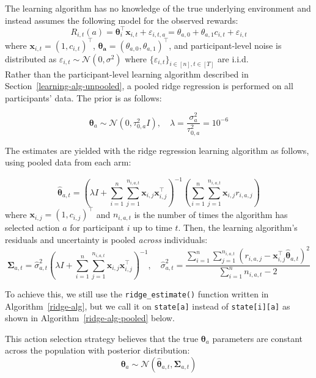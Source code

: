 \documentclass[letterpaper, 9pt]{extarticle}
\begin{document}
\begin{notebox}
The learning algorithm has no knowledge of the true underlying environment and instead assumes the following model for the observed rewards:
$$R_{i,t}(a) = \boldsymbol{\theta}_{i}^\top \boldsymbol{x}_{i,t} + \varepsilon_{i,t,a}=\theta_{a,0}+\theta_{a,1}c_{i,t}+\varepsilon_{i,t}$$
where $\boldsymbol{x}_{i,t} = (1, c_{i,t})^\top$, $\boldsymbol{\theta_{a}} = (\theta_{a,0}, \theta_{a,1})^\top$, and participant-level noise is distributed as $\varepsilon_{i,t} \sim \mathcal{N}(0,\sigma^2)$  where $\{\varepsilon_{i,t}\}_{i\in[n], t\in [T]}$ are i.i.d. \\

Rather than the participant-level learning algorithm described in Section~\ref{learning-alg-unpooled}, a pooled ridge regression is performed on all participants' data. The prior is as follows:

$$
\boldsymbol{\theta}_{a} \sim \mathcal{N}(0, \tau_{0,a}^2 I),
\quad
\lambda = \frac{\sigma_a^2}{\tau_{0,a}^2}=10^{-6}
$$

The estimates are yielded with the ridge regression learning algorithm as follows, using pooled data from each arm:

\[
\hat{\boldsymbol{\theta}}_{a,t}
=
\left(
\lambda I
+
\sum_{i=1}^{n}\sum_{j=1}^{n_{i,a,t}}
\boldsymbol{x}_{i,j}\boldsymbol{x}_{i,j}^{\top}
\right)^{-1}
\left(
\sum_{i=1}^{n}\sum_{j=1}^{n_{i,a,t}}
\boldsymbol{x}_{i,j}r_{i,a,j}
\right)
\]
 where $\boldsymbol{x}_{i,j} = (1, c_{i,j})^\top$ and $n_{i,a,t}$ is the number of times the algorithm has selected action $a$ for participant $i$ up to time $t$. Then, the learning algorithm's residuals and uncertainty is pooled \textit{across} individuals:
\[
\boldsymbol{\Sigma}_{a,t}
=
\hat{\sigma}_{a,t}^2
\left(
\lambda I
+
\sum_{i=1}^{n}\sum_{j=1}^{n_{i,a,t}}
\boldsymbol{x}_{i,j}\boldsymbol{x}_{i,j}^{\top}
\right)^{-1},
\quad
\hat{\sigma}_{a,t}^2
=
\frac{
\sum_{i=1}^{n}\sum_{j=1}^{n_{i,a,t}}
\left(
r_{i,a,j}
-
\boldsymbol{x}_{i,j}^{\top}\hat{\boldsymbol{\theta}}_{a,t}
\right)^2
}{
\sum_{i=1}^{n} n_{i,a,t} - 2
}
\]

To achieve this, we still use the \texttt{ridge\_estimate()} function written in Algorithm~\protect\ref{ridge-alg}, but we call it on \texttt{state[a]} instead of \texttt{state[i][a]} as shown in Algorithm~\ref{ridge-alg-pooled} below.

\end{notebox}

This action selection strategy believes that the true $\boldsymbol{\theta}_{a}$ parameters are constant across the population with posterior distribution:  
$$
\boldsymbol{\theta}_{a}
\sim
\mathcal{N}\!\left(
\hat{\boldsymbol{\theta}}_{a,t},
\boldsymbol{\Sigma}_{a,t}
\right)
$$
\end{document}

